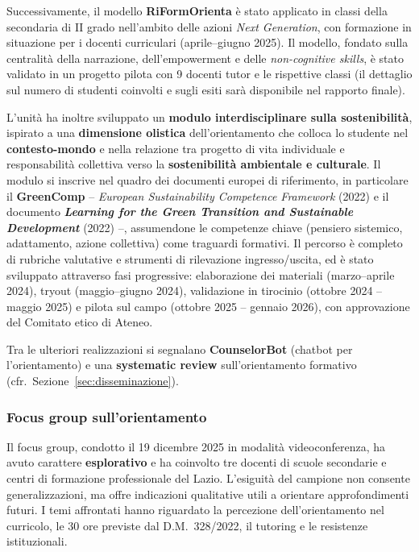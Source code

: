 \documentclass[12pt,a4paper]{article}
\begin{document}
Successivamente, il modello \textbf{RiFormOrienta} \`e stato applicato in classi della secondaria di II grado nell'ambito delle azioni \textit{Next Generation}, con formazione in situazione per i docenti curriculari (aprile--giugno 2025). Il modello, fondato sulla centralit\`a della narrazione, dell'empowerment e delle \textit{non-cognitive skills}, \`e stato validato in un progetto pilota con 9 docenti tutor e le rispettive classi (il dettaglio sul numero di studenti coinvolti e sugli esiti sar\`a disponibile nel rapporto finale).

L'unit\`a ha inoltre sviluppato un \textbf{modulo interdisciplinare sulla sostenibilit\`a}, ispirato a una \textbf{dimensione olistica} dell'orientamento che colloca lo studente nel \textbf{contesto-mondo} e nella relazione tra progetto di vita individuale e responsabilit\`a collettiva verso la \textbf{sostenibilit\`a ambientale e culturale}. Il modulo si inscrive nel quadro dei documenti europei di riferimento, in particolare il \textbf{GreenComp} -- \textit{European Sustainability Competence Framework} (2022) e il documento \textbf{\textit{Learning for the Green Transition and Sustainable Development}} (2022) --, assumendone le competenze chiave (pensiero sistemico, adattamento, azione collettiva) come traguardi formativi. Il percorso \`e completo di rubriche valutative e strumenti di rilevazione ingresso/uscita, ed \`e stato sviluppato attraverso fasi progressive: elaborazione dei materiali (marzo--aprile 2024), tryout (maggio--giugno 2024), validazione in tirocinio (ottobre 2024 -- maggio 2025) e pilota sul campo (ottobre 2025 -- gennaio 2026), con approvazione del Comitato etico di Ateneo.

Tra le ulteriori realizzazioni si segnalano \textbf{CounselorBot} (chatbot per l'orientamento) e una \textbf{systematic review} sull'orientamento formativo (cfr.\ Sezione~\ref{sec:disseminazione}).

\subsubsection{Focus group sull'orientamento}

Il focus group, condotto il 19 dicembre 2025 in modalit\`a videoconferenza, ha avuto carattere \textbf{esplorativo} e ha coinvolto tre docenti di scuole secondarie e centri di formazione professionale del Lazio. L'esiguit\`a del campione non consente generalizzazioni, ma offre indicazioni qualitative utili a orientare approfondimenti futuri. I temi affrontati hanno riguardato la percezione dell'orientamento nel curricolo, le 30 ore previste dal D.M.~328/2022, il tutoring e le resistenze istituzionali.
\end{document}
